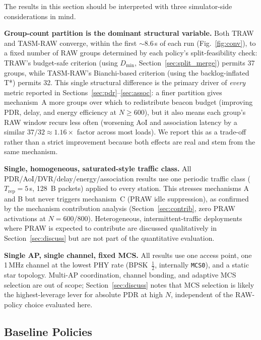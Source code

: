 \documentclass[journal]{IEEEtran}
\begin{document}
The results in this section should be interpreted with three
simulator-side considerations in mind.

\textbf{Group-count partition is the dominant structural variable.}
Both TRAW and TASM-RAW converge, within the first $\sim$8.6\,s of each
run (Fig.~\ref{fig:conv}), to a fixed number of RAW groups determined by
each policy's split-feasibility check: TRAW's budget-safe criterion
(using $D_\mathrm{min}$, Section~\ref{sec:split_merge}) permits 37 groups,
while TASM-RAW's Bianchi-based criterion (using the backlog-inflated
T*) permits 32. This single structural difference is the primary driver
of \emph{every} metric reported in Sections~\ref{sec:pdr}--\ref{sec:assoc}:
a finer partition gives mechanism~A more groups over which to
redistribute beacon budget (improving PDR, delay, and energy efficiency
at $N\!\geq\!600$), but it also means each group's RAW window recurs
less often (worsening AoI and association latency by a similar
$37/32\!\approx\!1.16\times$ factor across most loads). We report this
as a trade-off rather than a strict improvement because both effects
are real and stem from the same mechanism.

\textbf{Single, homogeneous, saturated-style traffic class.}
All PDR/AoI/DVR/delay/energy/association results use one periodic
traffic class ($T_\mathrm{rep}\!=\!5$\,s, 128~B packets) applied to
every station. This stresses mechanisms A and B but never triggers
mechanism~C (PRAW idle suppression), as confirmed by the mechanism
contribution analysis (Section~\ref{sec:contrib}, zero PRAW activations at
$N\!=\!600$/$800$). Heterogeneous, intermittent-traffic deployments
where PRAW is expected to contribute are discussed qualitatively in
Section~\ref{sec:discuss} but are not part of the quantitative evaluation.

\textbf{Single AP, single channel, fixed MCS.}
All results use one access point, one 1\,MHz channel at the lowest PHY
rate (BPSK~$\frac{1}{2}$, internally \texttt{MCS0}), and a static
star topology. Multi-AP coordination, channel bonding, and adaptive MCS
selection are out of scope; Section~\ref{sec:discuss} notes that MCS
selection is likely the highest-leverage lever for absolute PDR at high
$N$, independent of the RAW-policy choice evaluated here.

\subsection{Baseline Policies}
\end{document}

